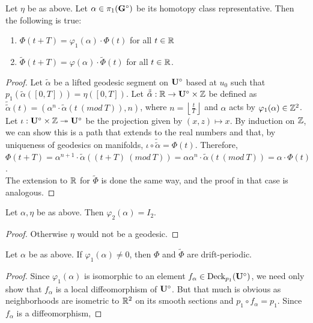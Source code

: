 \documentclass[a4paper, 11pt]{article}
\def\phitild{\tilde{\Phi}}
\begin{document}
\begin{thm}
Let $\eta$ be as above. Let $\alpha\in\pi_1(\mathbf{G}^\circ)$ be its homotopy class representative. Then the following is true:
\begin{enumerate}
\item $\Phi(t+T)=\varphi_1(\alpha)\cdot\Phi(t)$ for all $t\in\mathbb{R}$
\item $\phitild(t+T)=\varphi(\alpha)\cdot\phitild(t)$ for all $t\in\mathbb{R}$.
\end{enumerate}
\begin{proof}
Let $\tilde{\alpha}$ be a lifted geodesic segment on $\mathbf{U}^\circ$ based at $u_0$ such that $p_1(\tilde{\alpha}([0,T]))=\eta([0,T])$. Let $\tilde{\tilde{\alpha}}:\mathbb{R}\rightarrow\mathbf{U}^\circ\times\mathbb{Z}$ be defined as $\tilde{\tilde{\alpha}}(t)=(\alpha^n\cdot\tilde{\alpha}(t~(mod~T)),n)$, where $n=\left\lfloor \frac{t}{T}\right\rfloor$ and $\alpha$ acts by $\varphi_1(\alpha)\in\mathbb{Z}^2$. Let $\iota:\mathbf{U}^\circ\times\mathbb{Z}\twoheadrightarrow\mathbf{U}^\circ$ be the projection given by $(x,z)\mapsto x$. By induction on $\mathbb{Z}$, we can show this is a path that extends to the real numbers and that, by uniqueness of geodesics on manifolds, $\iota\circ\tilde{\tilde{\alpha}}=\Phi(t)$. Therefore, $\Phi(t+T)=\alpha^{n+1}\cdot\tilde{\alpha}((t+T)~(mod~T))=\alpha\alpha^n\cdot\tilde{\alpha}(t~(mod~T))=\alpha\cdot\Phi(t)$. \\
The extension to $\mathbb{R}$ for $\tilde{\Phi}$ is done the same way, and the proof in that case is analogous.
\end{proof}
\end{thm}

\begin{lem}
Let $\alpha,\eta$ be as above. Then $\varphi_2(\alpha)=I_2$.
\begin{proof}
Otherwise $\eta$ would not be a geodesic.
\end{proof}
\end{lem}

\begin{cor}
Let $\alpha$ be as above. If $\varphi_1(\alpha)\neq 0$, then $\Phi$ and $\phitild$ are drift-periodic.
\begin{proof}
Since $\varphi_1(\alpha)$ is isomorphic to an element $f_\alpha\in\text{Deck}_{p_1}(\mathbf{U}^\circ)$, we need only show that $f_\alpha$ is a local diffeomorphism of $\mathbf{U}^\circ$. But that much is obvious as neighborhoods are isometric to $\mathbb{R}^2$ on its smooth sections and $p_1\circ f_\alpha=p_1$. Since $f_\alpha$ is a diffeomorphism, 
\end{proof}
\end{cor}
\end{document}

